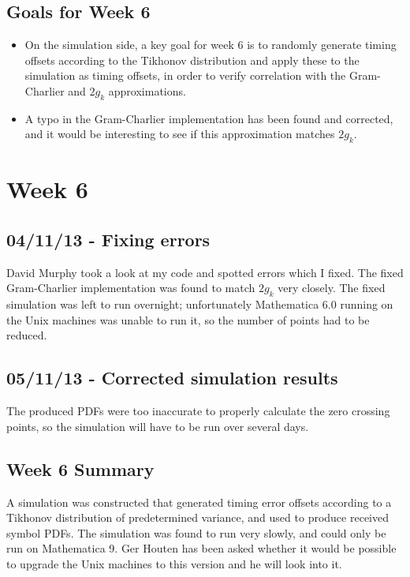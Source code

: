 \subsection{Goals for Week 6}

\begin{itemize}
\itemsep1pt\parskip0pt
\item
  On the simulation side, a key goal for week 6 is to randomly generate
  timing offsets according to the Tikhonov distribution and apply these
  to the simulation as timing offsets, in order to verify correlation
  with the Gram-Charlier and $2 g_k$ approximations.
\item
  A typo in the Gram-Charlier implementation has been found and
  corrected, and it would be interesting to see if this approximation
  matches $2 g_k$.
\end{itemize}

\section{Week 6}

\subsection{04/11/13 - Fixing errors}

David Murphy took a look at my code and spotted errors which I fixed. The fixed
Gram-Charlier implementation was found to match $2 g_k$ very closely.
The fixed simulation was left to run overnight; unfortunately
Mathematica 6.0 running on the Unix machines was unable to run it, so
the number of points had to be reduced.

\subsection{05/11/13 - Corrected simulation results}

The produced PDFs were too inaccurate to properly calculate the zero
crossing points, so the simulation will have to be run over several
days.

\subsection{Week 6 Summary}

A simulation was constructed that generated timing error offsets
according to a Tikhonov distribution of predetermined variance, and used
to produce received symbol PDFs. The simulation was found to run very
slowly, and could only be run on Mathematica 9. Ger Houten has been asked
whether it would be possible to upgrade the Unix machines to this
version and he will look into it.

